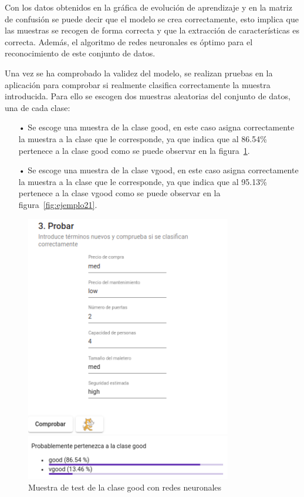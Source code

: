 \documentclass[a4paper, 12pt]{book}
\begin{document}
 
Con los datos obtenidos en la gráfica de evolución de aprendizaje y en la matriz de confusión se puede decir que el modelo se crea correctamente, esto implica que las muestras se recogen de forma correcta y que la extracción de características es correcta. Además, el algoritmo de redes neuronales es óptimo para el reconocimiento de este conjunto de datos.

Una vez se ha comprobado la validez del modelo, se realizan pruebas en la aplicación para comprobar si realmente clasifica correctamente la muestra introducida. Para ello se escogen dos muestras aleatorias del conjunto de datos, una de cada clase:

\begin{itemize}
\item[•] Se escoge una muestra de la clase good, en este caso asigna correctamente la muestra a la clase que le corresponde, ya que indica que al 86.54\% pertenece a la clase good como se puede observar en la figura~\ref{fig:ejemplo20}.
\item[•] Se escoge una muestra de la clase vgood, en este caso asigna correctamente la muestra a la clase que le corresponde, ya que indica que al 95.13\% pertenece a la clase vgood como se puede observar en la figura~\ref{fig:ejemplo21}. 
\end{itemize}

\begin{figure}
	\centering
	\includegraphics[width=9cm, keepaspectratio]{img/good_rn.png}
	\caption{Muestra de test de la clase good con redes neuronales} 	\label{fig:ejemplo20}
\end{figure}
\end{document}
